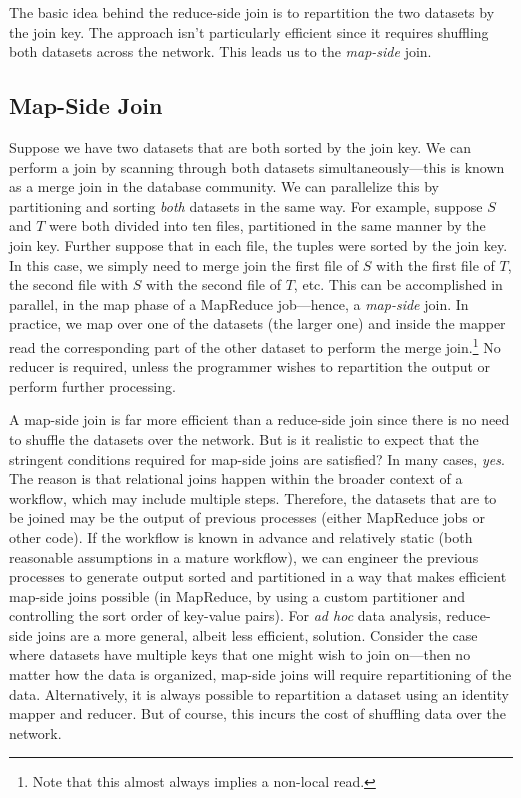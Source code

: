 The basic idea behind the reduce-side join is to repartition the two
datasets by the join key.  The approach isn't particularly efficient
since it requires shuffling both datasets across the network.  This
leads us to the \emph{map-side} join.


\subsection{Map-Side Join}

Suppose we have two datasets that are both sorted by the join key.  We
can perform a join by scanning through both datasets
simultaneously---this is known as a merge join in the database
community.  We can parallelize this by partitioning and sorting \emph{
  both} datasets in the same way.  For example, suppose $S$ and $T$
were both divided into ten files, partitioned in the same manner by
the join key.  Further suppose that in each file, the tuples were
sorted by the join key.  In this case, we simply need to merge join
the first file of $S$ with the first file of $T$, the second file with
$S$ with the second file of $T$, etc.  This can be accomplished in
parallel, in the map phase of a MapReduce job---hence, a \emph{
  map-side} join.  In practice, we map over one of the datasets (the
larger one) and inside the mapper read the corresponding part of the
other dataset to perform the merge join.\footnote{Note that this
  almost always implies a non-local read.}  No reducer is required,
unless the programmer wishes to repartition the output or perform
further processing.

A map-side join is far more efficient than a reduce-side join since
there is no need to shuffle the datasets over the network.  But is it
realistic to expect that the stringent conditions required for
map-side joins are satisfied?  In many cases, \emph{yes}.  The reason
is that relational joins happen within the broader context of a
workflow, which may include multiple steps.  Therefore, the datasets
that are to be joined may be the output of previous processes (either
MapReduce jobs or other code).  If the workflow is known in advance
and relatively static (both reasonable assumptions in a mature
workflow), we can engineer the previous processes to generate
output sorted and partitioned in a way that makes efficient map-side
joins possible (in MapReduce, by using a custom partitioner and
controlling the sort order of key-value pairs).  For \emph{ad hoc} data
analysis, reduce-side joins are a more general, albeit less efficient,
solution.  Consider the case where datasets have multiple keys that
one might wish to join on---then no matter how the data is organized,
map-side joins will require repartitioning of the data.
Alternatively, it is always possible to repartition a dataset using an
identity mapper and reducer.  But of course, this incurs the cost of
shuffling data over the network.

